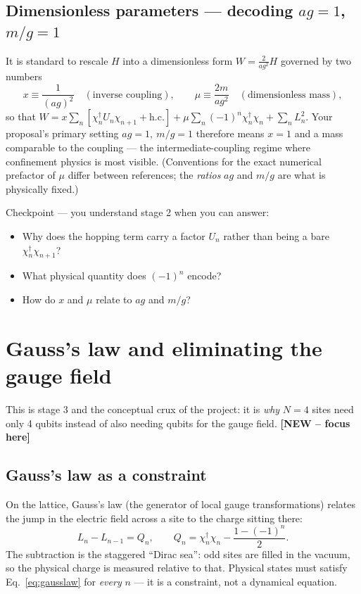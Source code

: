 \documentclass[11pt,a4paper]{article}
\newcommand{\newx}{\textcolor{red!70!black}{\textbf{[NEW -- focus here]}}}
\begin{document}
\subsection{Dimensionless parameters --- decoding $ag=1$, $m/g=1$}
It is standard to rescale $H$ into a dimensionless form $W=\frac{2}{ag^2}H$ governed by two numbers
\begin{equation}
x \equiv \frac{1}{(ag)^2}\quad(\text{inverse coupling}),\qquad
\mu \equiv \frac{2m}{ag^2}\quad(\text{dimensionless mass}),
\label{eq:dimensionless}
\end{equation}
so that $W=x\sum_n[\chi^\dagger_nU_n\chi_{n+1}+\text{h.c.}] + \mu\sum_n(-1)^n\chi^\dagger_n\chi_n + \sum_n L_n^2$.
Your proposal's primary setting $ag=1,\ m/g=1$ therefore means $x=1$ and a mass comparable to the
coupling --- the intermediate-coupling regime where confinement physics is most visible.
(Conventions for the exact numerical prefactor of $\mu$ differ between references; the \emph{ratios}
$ag$ and $m/g$ are what is physically fixed.)

\begin{checkbox}{Checkpoint --- you understand stage 2 when you can answer:}
\begin{itemize}[leftmargin=1.4em,nosep]
\item Why does the hopping term carry a factor $U_n$ rather than being a bare $\chi^\dagger_n\chi_{n+1}$?
\item What physical quantity does $(-1)^n$ encode?
\item How do $x$ and $\mu$ relate to $ag$ and $m/g$?
\end{itemize}
\end{checkbox}

\section{Gauss's law and eliminating the gauge field}\label{sec:gauss}

\begin{whybox}
This is stage 3 and the conceptual crux of the project: it is \emph{why} $N=4$ sites need only
4 qubits instead of also needing qubits for the gauge field. \newx
\end{whybox}

\subsection{Gauss's law as a constraint}
On the lattice, Gauss's law (the generator of local gauge transformations) relates the jump in the
electric field across a site to the charge sitting there:
\begin{equation}
L_n - L_{n-1} = Q_n, \qquad Q_n = \chi^\dagger_n\chi_n - \frac{1-(-1)^n}{2}.
\label{eq:gausslaw}
\end{equation}
The subtraction is the staggered ``Dirac sea'': odd sites are filled in the vacuum, so the physical
charge is measured relative to that. Physical states must satisfy Eq.~\eqref{eq:gausslaw} for
\emph{every} $n$ --- it is a constraint, not a dynamical equation.
\end{document}
